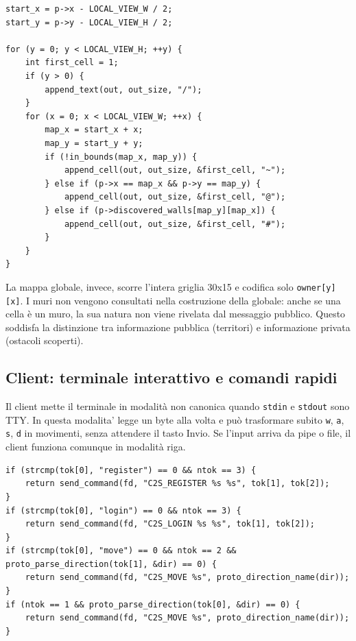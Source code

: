 \documentclass[11pt,a4paper]{article}
\begin{document}
\begin{lstlisting}[style=cstyle, caption={Costruzione della mappa locale.}]
start_x = p->x - LOCAL_VIEW_W / 2;
start_y = p->y - LOCAL_VIEW_H / 2;

for (y = 0; y < LOCAL_VIEW_H; ++y) {
    int first_cell = 1;
    if (y > 0) {
        append_text(out, out_size, "/");
    }
    for (x = 0; x < LOCAL_VIEW_W; ++x) {
        map_x = start_x + x;
        map_y = start_y + y;
        if (!in_bounds(map_x, map_y)) {
            append_cell(out, out_size, &first_cell, "~");
        } else if (p->x == map_x && p->y == map_y) {
            append_cell(out, out_size, &first_cell, "@");
        } else if (p->discovered_walls[map_y][map_x]) {
            append_cell(out, out_size, &first_cell, "#");
        }
    }
}
\end{lstlisting}

La mappa globale, invece, scorre l'intera griglia 30x15 e codifica solo
\texttt{owner[y][x]}. I muri non vengono consultati nella costruzione della
globale: anche se una cella è un muro, la sua natura non viene rivelata dal
messaggio pubblico. Questo soddisfa la distinzione tra informazione pubblica
(territori) e informazione privata (ostacoli scoperti).

\subsection{Client: terminale interattivo e comandi rapidi}

Il client mette il terminale in modalità non canonica quando \texttt{stdin} e
\texttt{stdout} sono TTY. In questa modalita' legge un byte alla volta e può trasformare subito \texttt{w}, \texttt{a}, \texttt{s}, \texttt{d} in movimenti, senza attendere il tasto Invio. Se l'input arriva da pipe o file, il client funziona comunque in modalità riga.

\begin{lstlisting}[style=cstyle, caption={Traduzione dei comandi utente in messaggi C2S.}]
if (strcmp(tok[0], "register") == 0 && ntok == 3) {
    return send_command(fd, "C2S_REGISTER %s %s", tok[1], tok[2]);
}
if (strcmp(tok[0], "login") == 0 && ntok == 3) {
    return send_command(fd, "C2S_LOGIN %s %s", tok[1], tok[2]);
}
if (strcmp(tok[0], "move") == 0 && ntok == 2 && proto_parse_direction(tok[1], &dir) == 0) {
    return send_command(fd, "C2S_MOVE %s", proto_direction_name(dir));
}
if (ntok == 1 && proto_parse_direction(tok[0], &dir) == 0) {
    return send_command(fd, "C2S_MOVE %s", proto_direction_name(dir));
}
\end{lstlisting}
\end{document}
